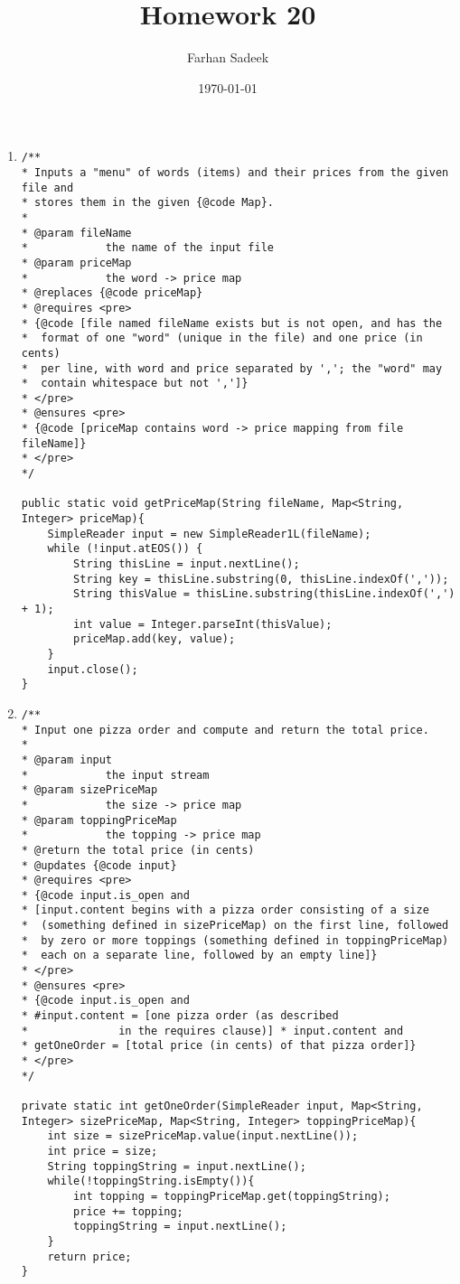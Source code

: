 \documentclass{article}
\title{Homework 20}
\author{Farhan Sadeek}
\date{\today}
\begin{document}
\maketitle
\begin{enumerate}
    \item \begin{verbatim}
/**
* Inputs a "menu" of words (items) and their prices from the given file and
* stores them in the given {@code Map}.
*
* @param fileName
*            the name of the input file
* @param priceMap
*            the word -> price map
* @replaces {@code priceMap}
* @requires <pre>
* {@code [file named fileName exists but is not open, and has the
*  format of one "word" (unique in the file) and one price (in cents)
*  per line, with word and price separated by ','; the "word" may
*  contain whitespace but not ',']}
* </pre>
* @ensures <pre>
* {@code [priceMap contains word -> price mapping from file fileName]}
* </pre>
*/

public static void getPriceMap(String fileName, Map<String, Integer> priceMap){
    SimpleReader input = new SimpleReader1L(fileName);
    while (!input.atEOS()) {
        String thisLine = input.nextLine();
        String key = thisLine.substring(0, thisLine.indexOf(','));
        String thisValue = thisLine.substring(thisLine.indexOf(',') + 1);
        int value = Integer.parseInt(thisValue);
        priceMap.add(key, value);
    }
    input.close();
}
\end{verbatim}

\item \begin{verbatim}
/**
* Input one pizza order and compute and return the total price.
*
* @param input
*            the input stream
* @param sizePriceMap
*            the size -> price map
* @param toppingPriceMap
*            the topping -> price map
* @return the total price (in cents)
* @updates {@code input}
* @requires <pre>
* {@code input.is_open and
* [input.content begins with a pizza order consisting of a size
*  (something defined in sizePriceMap) on the first line, followed
*  by zero or more toppings (something defined in toppingPriceMap)
*  each on a separate line, followed by an empty line]}
* </pre>
* @ensures <pre>
* {@code input.is_open and
* #input.content = [one pizza order (as described
*              in the requires clause)] * input.content and
* getOneOrder = [total price (in cents) of that pizza order]}
* </pre>
*/

private static int getOneOrder(SimpleReader input, Map<String, Integer> sizePriceMap, Map<String, Integer> toppingPriceMap){
    int size = sizePriceMap.value(input.nextLine());
    int price = size;
    String toppingString = input.nextLine();
    while(!toppingString.isEmpty()){
        int topping = toppingPriceMap.get(toppingString);
        price += topping;
        toppingString = input.nextLine();
    }
    return price;
}
\end{verbatim}
\end{enumerate}
\end{document}
